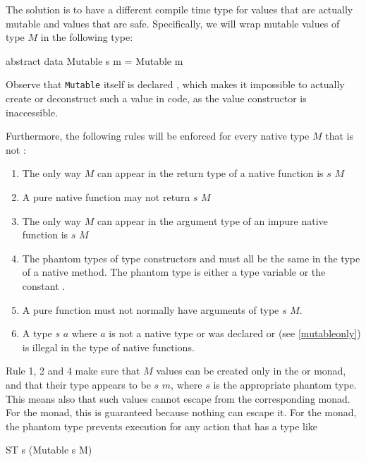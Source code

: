 The solution is to have a different compile time type for values that are actually mutable and values that are safe. Specifically, we will wrap mutable values of type $M$ in the following type:

\begin{code}
abstract data Mutable s m = Mutable m
\end{code}

Observe that \texttt{Mutable} itself is declared , which makes it impossible to actually create or deconstruct such a value in \frege{} code, as the value constructor is inaccessible.

Furthermore, the following rules will be enforced for every native type $M$ that is not :

\begin{enumerate}
\item The only way $M$ can appear in the return type of a native function is  $s$ $M$
\item A pure native function may not return  $s$ $M$
\item The only way $M$ can appear in the argument type of an impure native function is  $s$ $M$
\item The phantom types of type constructors  and  must all be the same in the type of a native method. The phantom type is either a type variable or the constant .
\item A pure function must not normally have arguments of type  $s$ $M$.
\item A type  $s$ $a$ where $a$ is not a native type or was declared  or  (see \autoref{mutableonly}) is illegal in the type of native functions.
\end{enumerate}

Rule 1, 2 and 4 make sure that $M$ values can be created only in the  or  monad, and that their type appears to be  $s$ $m$, where $s$ is the appropriate phantom type. 
This means also that such values cannot escape from the corresponding monad. 
For the  monad, this is guaranteed because nothing can escape it. 
For the  monad, the phantom type prevents execution for any  action that has a type like

\begin{code}
ST s (Mutable s M)
\end{code}

